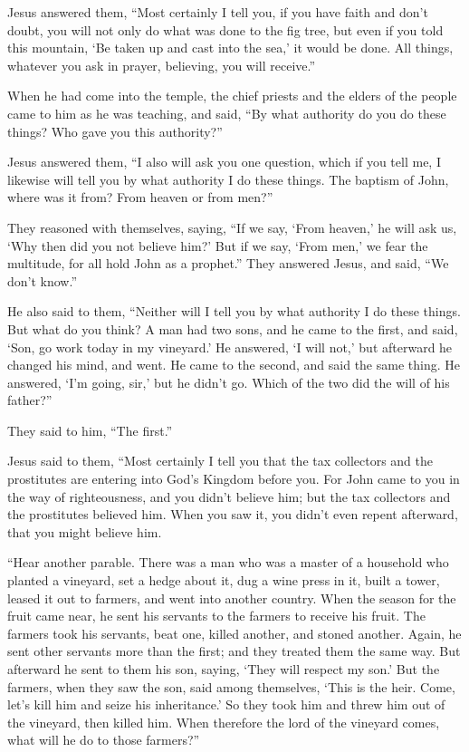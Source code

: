  Jesus answered them, ``Most certainly I tell you, if you
have faith and don't doubt, you will not only do what was done to the
fig tree, but even if you told this mountain, `Be taken up and cast into
the sea,' it would be done.  All things, whatever you ask
in prayer, believing, you will receive.''

 When he had come into the temple, the chief priests and
the elders of the people came to him as he was teaching, and said, ``By
what authority do you do these things? Who gave you this authority?''

 Jesus answered them, ``I also will ask you one question,
which if you tell me, I likewise will tell you by what authority I do
these things.  The baptism of John, where was it from?
From heaven or from men?''

They reasoned with themselves, saying, ``If we say, `From heaven,' he
will ask us, `Why then did you not believe him?'  But if
we say, `From men,' we fear the multitude, for all hold John as a
prophet.''  They answered Jesus, and said, ``We don't
know.''

He also said to them, ``Neither will I tell you by what authority I do
these things.  But what do you think? A man had two sons,
and he came to the first, and said, `Son, go work today in my vineyard.'
 He answered, `I will not,' but afterward he changed his
mind, and went.  He came to the second, and said the same
thing. He answered, `I'm going, sir,' but he didn't go. 
Which of the two did the will of his father?''

They said to him, ``The first.''

Jesus said to them, ``Most certainly I tell you that the tax collectors
and the prostitutes are entering into God's Kingdom before you.
 For John came to you in the way of righteousness, and
you didn't believe him; but the tax collectors and the prostitutes
believed him. When you saw it, you didn't even repent afterward, that
you might believe him.

 ``Hear another parable. There was a man who was a master
of a household who planted a vineyard, set a hedge about it, dug a wine
press in it, built a tower, leased it out to farmers, and went into
another country.  When the season for the fruit came
near, he sent his servants to the farmers to receive his fruit.
 The farmers took his servants, beat one, killed another,
and stoned another.  Again, he sent other servants more
than the first; and they treated them the same way.  But
afterward he sent to them his son, saying, `They will respect my son.'
 But the farmers, when they saw the son, said among
themselves, `This is the heir. Come, let's kill him and seize his
inheritance.'  So they took him and threw him out of the
vineyard, then killed him.  When therefore the lord of
the vineyard comes, what will he do to those farmers?''

